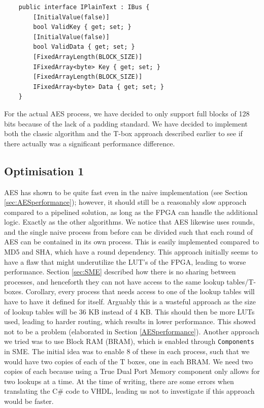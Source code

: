 \documentclass[a4paper, openany]{book}
\begin{document}
\begin{abstact}
\begin{verbatim}
    public interface IPlainText : IBus {
        [InitialValue(false)]
        bool ValidKey { get; set; }
        [InitialValue(false)]
        bool ValidData { get; set; }
        [FixedArrayLength(BLOCK_SIZE)]
        IFixedArray<byte> Key { get; set; }
        [FixedArrayLength(BLOCK_SIZE)]
        IFixedArray<byte> Data { get; set; }
    }
\end{verbatim}
For the actual AES process, we have decided to only support full blocks of 128 bits because of the lack of a padding standard. We have decided to implement both the classic algorithm and the T-box approach described earlier to see if there actually was a significant performance difference.

\subsection{Optimisation 1}
\label{AESopt}
AES has shown to be quite fast even in the naive implementation (see Section \ref{sec:AESperformance}); however, it should still be a reasonably slow approach compared to a pipelined solution, as long as the FPGA can handle the additional logic. Exactly as the other algorithms. We notice that AES likewise uses rounds, and the single naive process from before can be divided such that each round of AES can be contained in its own process. This is easily implemented compared to MD5 and SHA, which have a round dependency. This approach initially seems to have a flaw that might underutilize the LUT's of the FPGA, leading to worse performance. Section \ref{sec:SME} described how there is no sharing between processes, and henceforth they can not have access to the same lookup tables/T-boxes. Corollary, every process that needs access to one of the lookup tables will have to have it defined for itself. Arguably this is a wasteful approach as the size of lookup tables will be 36 KB instead of 4 KB. This should then be more LUTs used, leading to harder routing, which results in lower performance. This showed not to be a problem (elaborated in Section \ref{AESperformance}). Another approach we tried was to use Block RAM (BRAM), which is enabled through \texttt{Components} in SME. The initial idea was to enable 8 of these in each process, such that we would have two copies of each of the T boxes, one in each BRAM. We need two copies of each because using a True Dual Port Memory component only allows for two lookups at a time. At the time of writing, there are some errors when translating the C\# code to VHDL, leading us not to investigate if this approach would be faster.

\end{abstact}
\end{document}
